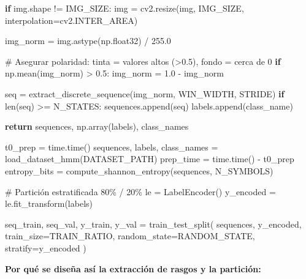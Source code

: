 \documentclass[
  spanish,
  us-letterpaper,
]{scrreprt}
\newenvironment{Shaded}{\begin{snugshade}}{\end{snugshade}}
\newcommand{\BuiltInTok}[1]{\textcolor[rgb]{0.00,0.23,0.31}{#1}}
\newcommand{\CommentTok}[1]{\textcolor[rgb]{0.37,0.37,0.37}{#1}}
\newcommand{\ControlFlowTok}[1]{\textcolor[rgb]{0.00,0.23,0.31}{\textbf{#1}}}
\newcommand{\FloatTok}[1]{\textcolor[rgb]{0.68,0.00,0.00}{#1}}
\newcommand{\NormalTok}[1]{\textcolor[rgb]{0.00,0.23,0.31}{#1}}
\newcommand{\OperatorTok}[1]{\textcolor[rgb]{0.37,0.37,0.37}{#1}}
\theoremstyle{definition}
\theoremstyle{remark}
\begin{document}
\begin{Shaded}
\begin{Highlighting}[]
            \ControlFlowTok{if}\NormalTok{ img.shape }\OperatorTok{!=}\NormalTok{ IMG\_SIZE:}
\NormalTok{                img }\OperatorTok{=}\NormalTok{ cv2.resize(img, IMG\_SIZE, interpolation}\OperatorTok{=}\NormalTok{cv2.INTER\_AREA)}

\NormalTok{            img\_norm }\OperatorTok{=}\NormalTok{ img.astype(np.float32) }\OperatorTok{/} \FloatTok{255.0}

            \CommentTok{\# Asegurar polaridad: tinta = valores altos (\textgreater{}0.5), fondo = cerca de 0}
            \ControlFlowTok{if}\NormalTok{ np.mean(img\_norm) }\OperatorTok{\textgreater{}} \FloatTok{0.5}\NormalTok{:}
\NormalTok{                img\_norm }\OperatorTok{=} \FloatTok{1.0} \OperatorTok{{-}}\NormalTok{ img\_norm}

\NormalTok{            seq }\OperatorTok{=}\NormalTok{ extract\_discrete\_sequence(img\_norm, WIN\_WIDTH, STRIDE)}
            \ControlFlowTok{if} \BuiltInTok{len}\NormalTok{(seq) }\OperatorTok{\textgreater{}=}\NormalTok{ N\_STATES:}
\NormalTok{                sequences.append(seq)}
\NormalTok{                labels.append(class\_name)}

    \ControlFlowTok{return}\NormalTok{ sequences, np.array(labels), class\_names}

\NormalTok{t0\_prep }\OperatorTok{=}\NormalTok{ time.time()}
\NormalTok{sequences, labels, class\_names }\OperatorTok{=}\NormalTok{ load\_dataset\_hmm(DATASET\_PATH)}
\NormalTok{prep\_time }\OperatorTok{=}\NormalTok{ time.time() }\OperatorTok{{-}}\NormalTok{ t0\_prep}
\NormalTok{entropy\_bits }\OperatorTok{=}\NormalTok{ compute\_shannon\_entropy(sequences, N\_SYMBOLS)}

\CommentTok{\# Partición estratificada 80\% / 20\%}
\NormalTok{le }\OperatorTok{=}\NormalTok{ LabelEncoder()}
\NormalTok{y\_encoded }\OperatorTok{=}\NormalTok{ le.fit\_transform(labels)}

\NormalTok{seq\_train, seq\_val, y\_train, y\_val }\OperatorTok{=}\NormalTok{ train\_test\_split(}
\NormalTok{    sequences, y\_encoded,}
\NormalTok{    train\_size}\OperatorTok{=}\NormalTok{TRAIN\_RATIO,}
\NormalTok{    random\_state}\OperatorTok{=}\NormalTok{RANDOM\_STATE,}
\NormalTok{    stratify}\OperatorTok{=}\NormalTok{y\_encoded}
\NormalTok{)}
\end{Highlighting}
\end{Shaded}

\textbf{Por qué se diseña así la extracción de rasgos y la partición:}
\end{document}
